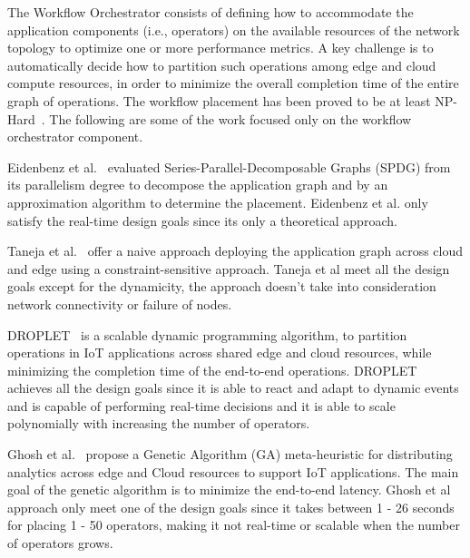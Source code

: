 The Workflow Orchestrator consists of defining how to accommodate the application components (i.e., operators) on the available resources of the network topology to optimize one or more performance metrics. A key challenge is to automatically decide how to partition such operations among edge and cloud compute resources, in order to minimize the overall completion time of the entire graph of operations. The workflow placement has been proved to be at least NP-Hard~\cite{Benoit:2013}. The following are some of the work focused only on the workflow orchestrator component.

Eidenbenz et al.~\cite{Eidenbenz:2016} evaluated Series-Parallel-Decomposable Graphs (SPDG) from its parallelism degree to decompose the application graph and by an approximation algorithm to determine the placement. Eidenbenz et al. only satisfy the real-time design goals since its only a theoretical approach.

Taneja et al.~\cite{Taneja:2017} offer a naive approach deploying the application graph across cloud and edge using a constraint-sensitive approach. Taneja et al meet all the design goals except for the dynamicity, the approach doesn't take into consideration network connectivity or failure of nodes.


DROPLET~\cite{8457776} is a scalable dynamic programming algorithm, to partition operations in IoT applications across shared edge and cloud resources, while minimizing the completion time of the end-to-end operations. DROPLET achieves all the design goals since it is able to react and adapt to dynamic events and is capable of performing real-time decisions and it is able to scale polynomially with increasing the number of operators. 

Ghosh et al.~\cite{Ghosh:2018} propose a Genetic Algorithm (GA) meta-heuristic for distributing analytics across edge and Cloud resources to support IoT applications. The main goal of the genetic algorithm is to minimize the end-to-end latency. Ghosh et al approach only meet one of the design goals since it takes between 1 - 26 seconds for placing 1 - 50 operators, making it not real-time or scalable when the number of operators grows.

